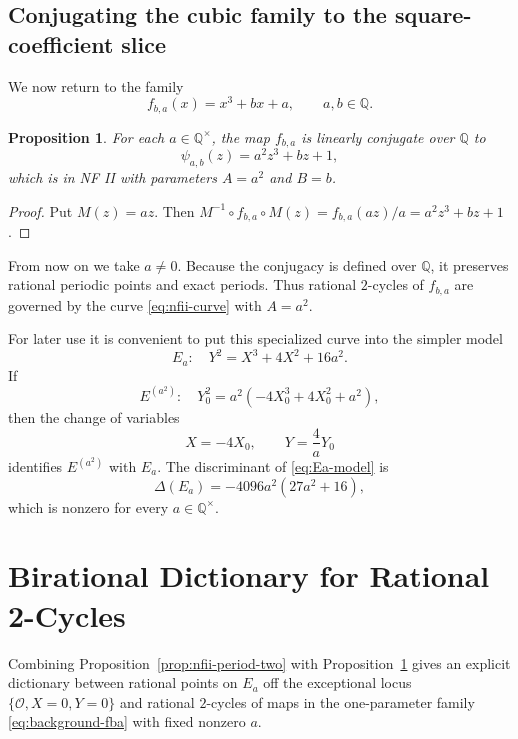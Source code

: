 \documentclass[11pt,a4paper]{amsart}
\newtheorem{proposition}[theorem]{Proposition}
\theoremstyle{definition}
\theoremstyle{remark}
\numberwithin{equation}{section}
\newcommand{\Q}{\mathbb{Q}}
\begin{document}
\subsection{Conjugating the cubic family to the square-coefficient slice}\label{subsec:background-conjugacy}

We now return to the family
\begin{equation}\label{eq:background-fba}
f_{b,a}(x)=x^3+bx+a,\qquad a,b\in\Q.
\end{equation}

\begin{proposition}\label{prop:conjugacy}
For each $a\in\Q^\times$, the map $f_{b,a}$ is linearly conjugate over $\Q$ to
\[
\psi_{a,b}(z)=a^2z^3+bz+1,
\]
which is in NF II with parameters $A=a^2$ and $B=b$.
\end{proposition}

\begin{proof}
Put $M(z)=az$. Then
\(M^{-1}\circ f_{b,a}\circ M(z)=f_{b,a}(az)/a=a^2z^3+bz+1\).
\end{proof}

From now on we take $a\neq0$. Because the conjugacy is defined over $\Q$,
it preserves rational periodic points and exact periods. Thus rational
$2$-cycles of $f_{b,a}$ are governed by the curve
\eqref{eq:nfii-curve} with $A=a^2$.

For later use it is convenient to put this specialized curve into the simpler model
\begin{equation}\label{eq:Ea-model}
E_a:\quad Y^2=X^3+4X^2+16a^2.
\end{equation}
If
\[
E^{(a^2)}:\quad Y_0^2=a^2(-4X_0^3+4X_0^2+a^2),
\]
then the change of variables
\begin{equation}\label{eq:Ea-change}
X=-4X_0,\qquad Y=\frac{4}{a}Y_0
\end{equation}
identifies $E^{(a^2)}$ with $E_a$. The discriminant of \eqref{eq:Ea-model} is
\[
\Delta(E_a)=-4096a^2(27a^2+16),
\]
which is nonzero for every $a\in\Q^\times$.

\section{Birational Dictionary for Rational 2-Cycles}\label{sec:dictionary}

Combining Proposition~\ref{prop:nfii-period-two} with Proposition~\ref{prop:conjugacy} gives an explicit dictionary between rational points on $E_a$ off the exceptional locus $\{\mathcal O,X=0,Y=0\}$ and rational $2$-cycles of maps in the one-parameter family \eqref{eq:background-fba} with fixed nonzero $a$.
\end{document}
